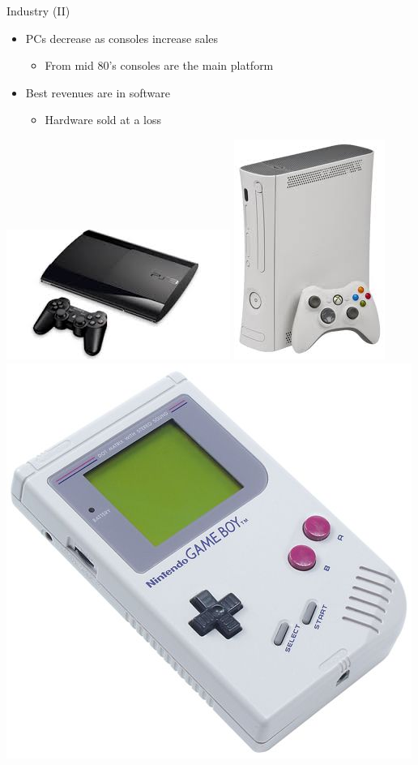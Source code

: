 \documentclass[10pt,compress]{beamer} %
\begin{document}
\begin{frame}{Industry (II)}
	\begin{itemize}
		\item PCs decrease as consoles increase sales
	    \begin{itemize}
		    \item From mid 80's consoles are the main platform
	    \end{itemize}

		\item Best revenues are in software
		\begin{itemize}
		\item Hardware sold at a loss
		\end{itemize}
	\end{itemize}

	\begin{center}
	\includegraphics[width=0.3\linewidth]{figs/ps3.jpeg}
	\includegraphics[width=0.15\linewidth]{figs/xbox.jpeg}
	\includegraphics[width=0.2\linewidth]{figs/gameboy}
	\end{center}
\end{frame}
\end{document}
